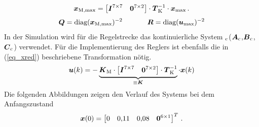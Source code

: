 \begin{equation}
\boldsymbol{x}_{\text{M,max}} = \begin{bmatrix}
\boldsymbol{I}^{7\times 7} & \boldsymbol{0}^{7\times 2}
\end{bmatrix}\cdot \boldsymbol{T}^{-1}_{\text{K}} \cdot \boldsymbol{x}_{\text{max}} \,.
\label{eq_xred}
\end{equation}
\begin{equation}
\boldsymbol{Q} = \text{diag}(\boldsymbol{x}_{\text{M,max}})^{-2} \hspace{35pt} \boldsymbol{R} = \text{diag}(\boldsymbol{u}_{\text{max}})^{-2}
\end{equation}
In der Simulation wird für die Regelstrecke das kontinuierliche System $_{\text{c}}$($\boldsymbol{A}_{\text{c}}$,$\boldsymbol{B}_{\text{c}}$,$\boldsymbol{C}_{\text{c}}$) verwendet. Für die Implementierung des Reglers ist ebenfalls die in (\ref{eq_xred}) beschriebene Transformation nötig.
\begin{equation}
\boldsymbol{u}(k) = -\underbrace{\boldsymbol{K}_{\text{M}}\cdot \begin{bmatrix}
\boldsymbol{I}^{7\times 7} & \boldsymbol{0}^{7\times 2}
\end{bmatrix} \cdot \boldsymbol{T}^{-1}_{\text{K}}}_{\equiv \boldsymbol{K}} \cdot \boldsymbol{x}(k)
\end{equation}
Die folgenden Abbildungen zeigen den Verlauf des Systems bei dem Anfangszustand
\begin{equation}
\boldsymbol{x}(0) = \begin{bmatrix}
0 & 0{,}11 & 0{,}08 & \boldsymbol{0}^{6\times 1}
\end{bmatrix}^T \,.
\end{equation}

